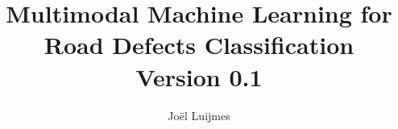 \documentclass{article}
\begin{document}

\title{
    Multimodal Machine Learning for Road Defects Classification \\
    \small Version 0.1
}
\author{Joël Luijmes}

\maketitle

\tableofcontents









\end{document}
